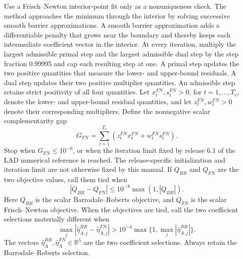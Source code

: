 \documentclass[11pt]{article}
\begin{document}
Use a Frisch--Newton interior-point fit only as a nonuniqueness check. The method approaches the
minimum through the interior by solving successive smooth barrier approximations. A
smooth barrier approximation adds a differentiable penalty that grows near the boundary and thereby
keeps each intermediate coefficient vector in the interior. At every iteration, multiply the
largest admissible primal step and the largest admissible dual step by the step fraction 0.99995
and cap each resulting step at one. A primal step updates the two positive quantities that measure
the lower- and upper-bound residuals. A dual step updates their two positive multiplier quantities. An
admissible step retains strict positivity of all four quantities. Let
\(x_t^{FN},s_t^{FN}>0\), for \(t=1,\ldots,T_v\), denote the lower- and upper-bound residual quantities,
and let \(z_t^{FN},w_t^{FN}>0\) denote their corresponding multipliers. Define the nonnegative scalar complementarity gap
\begin{equation*}
 G_{FN}=\sum_{t=1}^{T_v}\left(z_t^{FN}x_t^{FN}+w_t^{FN}s_t^{FN}\right).
\end{equation*}
Stop when \(G_{FN}\le10^{-6}\), or when the iteration limit fixed by release 6.1 of the LAD numerical
reference is reached. The release-specific initialization and iteration limit are not otherwise fixed
by this manual. If
\(Q_{BR}\) and \(Q_{FN}\) are the two
objective values, call them tied when
\begin{equation*}
 |Q_{BR}-Q_{FN}|\le10^{-8}\max(1,|Q_{BR}|).
\end{equation*}
Here \(Q_{BR}\) is the scalar Barrodale--Roberts objective, and \(Q_{FN}\) is the scalar
Frisch--Newton objective. When the objectives are tied, call the two coefficient selections materially
different when
\begin{equation*}
 \max_j|\widehat\eta_{A,j}^{BR}-\widehat\eta_{A,j}^{FN}|
 >10^{-4}\max\{1,\max_j|\widehat\eta_{A,j}^{BR}|\}.
\end{equation*}
The vectors \(\widehat\eta_A^{BR},\widehat\eta_A^{FN}\in\mathbb R^5\) are the two coefficient
selections. Always retain the Barrodale--Roberts selection.
\end{document}
